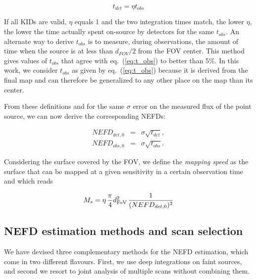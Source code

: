 \begin{equation}
t_{det} = \eta t_{obs}
\label{eq:t_det}
\end{equation}

If all KIDs are valid, $\eta$ equals 1 and the two integration times match, the
lower $\eta$, the lower the time actually spent on-source by detectors for the
same $t_{obs}$. An alternate way to derive $t_{obs}$ is to measure, during
observations, the amount of time when the source is at less than $d_{FOV}/2$
from the FOV center. This method gives values of $t_{obs}$ that agree with
eq.~(\ref{eq:t_obs}) to better than 5\%. In this work, we consider $t_{obs}$ as
given by eq.~(\ref{eq:t_obs}) because it is derived from the final map and can
therefore be generalized to any other place on the map than its center.

From these definitions and for the same $\sigma$ error on the measured flux of
the point source, we can now derive the corresponding NEFDs:

\begin{eqnarray}
NEFD_{det,0} & = & \sigma \sqrt{t_{det}} \label{eq:nefd_det},\\
NEFD_{obs,0} & = & \sigma \sqrt{t_{obs}} \label{eq:nefd_obs}.
\end{eqnarray}

Considering the surface covered by the FOV, we define the \emph{mapping speed}
as the surface that can be mapped at a given sensitivity in a certain
observation time and which reads

\begin{equation}
M_s = \eta \, \frac{\pi}{4} d_{\rm{FoV}}^2 \, \frac{1}{(NEFD_{det,0})^2}
\label{eq:mapping_speed}
\end{equation}

\subsection{NEFD estimation methods and scan selection}
\label{se:nefd_method}

We have devised three complementary methods for the
NEFD estimation, which come in two different flavours. First, we
use deep integrations on faint sources, and second we resort to 
joint analysis of multiple scans without combining them.\\

